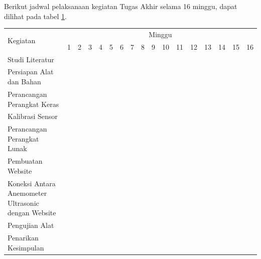 Berikut jadwal pelaksanaan kegiatan Tugas Akhir selama 16 minggu, dapat dilihat pada tabel \ref{tbl:timeline}.
\newcommand{\w}{}
\newcommand{\G}{\cellcolor{gray}}
\begin{table}[h!]
  \begin{tabular}{|p{3.5cm}|c|c|c|c|c|c|c|c|c|c|c|c|c|c|c|c|}

    \hline
    \multirow{2}{*}{Kegiatan} & \multicolumn{16}{|c|}{Minggu} \\
    \cline{2-17} &
    1 & 2 & 3 & 4 & 5 & 6 & 7 & 8 & 9 & 10 & 11 & 12 & 13 & 14 & 15 & 16 \\
    \hline

    Studi Literatur &
    \G & \w & \w & \w & \w & \w & \w & \w & \w & \w & \w & \w & \w & \w & \w & \w \\
    \hline

    Persiapan Alat dan Bahan &
    \w & \G & \G & \w & \w & \w & \w & \w & \w & \w & \w & \w & \w & \w & \w & \w \\
    \hline

    Perancangan Perangkat Keras &
    \w & \w & \w & \G & \G & \w & \w & \w & \w & \w & \w & \w & \w & \w & \w & \w \\
    \hline

    Kalibrasi Sensor &
    \w & \w & \w & \w & \w & \G & \G & \w & \w & \w & \w & \w & \w & \w & \w & \w \\
    \hline

    Perancangan Perangkat Lunak &
    \w & \w & \w & \w & \w & \w & \w & \G & \G & \w & \w & \w & \w & \w & \w & \w \\
    \hline

    Pembuatan Website &
    \w & \w & \w & \w & \w & \w & \w & \w & \w & \G & \G & \w & \w & \w & \w & \w \\
    \hline

    Koneksi Antara Anemometer Ultrasonic dengan Website &
    \w & \w & \w & \w & \w & \w & \w & \w & \w & \w & \w & \G & \w & \w & \w & \w \\
    \hline

    Pengujian Alat &
    \w & \w & \w & \w & \w & \w & \w & \w & \w & \w & \w & \w & \G & \G & \w & \w \\
    \hline

    Penarikan Kesimpulan &
    \w & \w & \w & \w & \w & \w & \w & \w & \w & \w & \w & \w & \w & \w & \G & \G \\
    \hline

  \end{tabular}
  \label{tbl:timeline}
\end{table}


